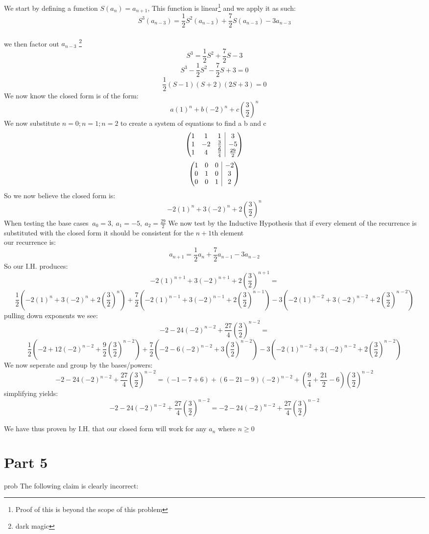 \documentclass{article}
\makeatletter
\newcounter{prob}\setcounter{prob}{1}\newcommand{\prob}{\arabic{prob}.\indent \addtocounter{prob}{1}}
\newenvironment{amatrix}[1]{%
	\left(\begin{array}{@{}*{#1}{c}|c@{}}
	}{%
\end{array}\right)
}
\makeatother
\begin{document}
We start by defining a function $S(a_n) =a_{n+1}$, This function is linear\footnote{Proof of this is beyond the scope of this problem} and we apply it as such:
$$S^3(a_{n-3})= \frac{1}{2}S^2(a_{n-3})+\frac{7}{2}S(a_{n-3})-3a_{n-3}$$\\
we then factor out $a_{n-3}$ \footnote{dark magic}
$$S^3= \frac{1}{2}S^2+\frac{7}{2}S-3$$
$$S^3 -\frac{1}{2}S^2-\frac{7}{2}S+3=0$$
$$\frac{1}{2}(S-1)(S+2)(2S+3)=0$$
We now know the closed form is of the form:
$$a(1)^n+b(-2)^n+c(\frac{3}{2})^n$$
We now substitute $n=0;n=1;n=2$ to create a system of equations to find a b and c
$$\begin{amatrix}{3}
	1 & 1 & 1 & 3 \\  1 & -2 & \frac{3}{2} & -5 \\ 1 & 4 & \frac{9}{4} & \frac{29}{2} 
\end{amatrix}$$
$$\begin{amatrix}{3}
1 & 0 & 0 & -2 \\  0 & 1 & 0 & 3 \\ 0 & 0 & 1 & 2 
\end{amatrix}$$
So we now believe the closed form is:
$$-2(1)^n+3(-2)^n+2(\frac{3}{2})^n$$
When testing the base cases $\ a_0=3,\ a_1=-5,\ a_2=\frac{29}{2}$
We now test by the Inductive Hypothesis that if every element of the recurrence is substituted with the closed form it should be consistent for the $n+1$th element\\
our recurrence is:
$$a_{n+1}= \frac{1}{2}a_{n}+\frac{7}{2}a_{n-1}-3a_{n-2}$$
So our I.H. produces:
$$-2(1)^{n+1}+3(-2)^{n+1}+2(\frac{3}{2})^{n+1}=$$$$ \frac{1}{2}(-2(1)^{n}+3(-2)^{n}+2(\frac{3}{2})^{n})+\frac{7}{2}(-2(1)^{n-1}+3(-2)^{n-1}+2(\frac{3}{2})^{n-1})-3(-2(1)^{n-2}+3(-2)^{n-2}+2(\frac{3}{2})^{n-2})$$
pulling down exponents we see:
$$-2-24(-2)^{n-2}+\frac{27}{4}(\frac{3}{2})^{n-2}=$$$$ \frac{1}{2}(-2+12(-2)^{n-2}+\frac{9}{2}(\frac{3}{2})^{n-2})+\frac{7}{2}(-2-6(-2)^{n-2}+3(\frac{3}{2})^{n-2})-3(-2(1)^{n-2}+3(-2)^{n-2}+2(\frac{3}{2})^{n-2})$$
We now seperate and group by the bases/powers:
$$-2-24(-2)^{n-2}+\frac{27}{4}(\frac{3}{2})^{n-2}=(-1-7+6) +(6-21-9)(-2)^{n-2}+(\frac{9}{4}+\frac{21}{2}-6)(\frac{3}{2})^{n-2}$$
simplifying yields: 
$$-2-24(-2)^{n-2}+\frac{27}{4}(\frac{3}{2})^{n-2}=-2 -24(-2)^{n-2} +\frac{27}{4}(\frac{3}{2})^{n-2}$$

We have thus proven by I.H. that our closed form will work for any $a_n$ where $n\geq0$
\newpage
\section{Part 5}
prob The following claim is clearly incorrect:\\
\end{document}
